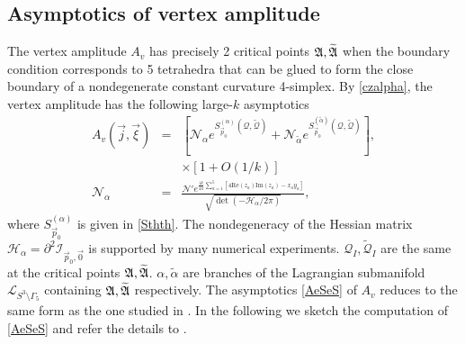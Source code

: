 \documentclass[aps,prd,notitlepage,nofootinbib,superscriptaddress,groupedaddress,twocolumn]{revtex4-1}
\def\be{\begin{eqnarray}}
\def\ee{\end{eqnarray}}
\newcommand{\ci}{\mathcal I}
\newcommand{\cl}{\mathcal L}
\newcommand{\cn}{\mathcal N}
\newcommand{\scrp}{\mathscr{P}}
\newcommand{\scrq}{\mathscr{Q}}
\renewcommand{\a}{\alpha}
\newcommand{\G}{\Gamma}
\newcommand{\rmd}{\mathrm d}
\newcommand{\lt}{\left}
\newcommand{\rt}{\right}
\newcommand{\sn}{\mathscr{N}}
\begin{document}
\subsection{Asymptotics of vertex amplitude}\label{Asymptotics of vertex amplitude}


The vertex amplitude $A_v$ has precisely 2 critical points $\mathfrak{A},\widetilde{\mathfrak{A}}$ when the boundary condition corresponds to 5 tetrahedra that can be glued to form the close boundary of a nondegenerate constant curvature 4-simplex. By \eqref{czalpha}, the vertex amplitude has the following large-$k$ asymptotics
\be
A_v(\vec{j},\vec{\xi})&=&\lt[\sn_\a e^{S_{\vec{p}_{0}}^{(\alpha)}({\scrq}, {\widetilde{\scrq}})}+\sn_{\widetilde \a} e^{S_{\vec{p}_{0}}^{(\widetilde{\alpha})}({\scrq}, {\widetilde{\scrq}})}\rt],\label{AeSeS}\\
&&\times \lt[1+O\lt({1}/{k}\rt)\rt]\nonumber\\
\sn_{\a}&=&\frac{\cn'e^{\frac{ik}{4\pi}\sum_{a=1}^5\lt[4\mathrm{Re}(z_a)\mathrm{Im}(z_a)-x_ay_a\rt]}}{\sqrt{\det (-\mathscr{H}_{\a}/2\pi)}},
\ee
where $S_{\vec{p}_{0}}^{(\alpha)}$ is given in \eqref{Sthth}. The nondegeneracy of the Hessian matrix $\mathscr{H}_{\a}=\partial^2\ci_{\vec{p}_0,\vec{0}}$ is supported by many numerical experiments. ${\scrq}_I, {\widetilde{\scrq}}_I$ are the same at the critical points $\mathfrak{A},\widetilde{\mathfrak{A}}$. $\a,\widetilde{\a}$ are branches of the Lagrangian submanifold $\cl_{S^3\setminus \G_5}$ containing $\mathfrak{A},\widetilde{\mathfrak{A}}$ respectively. The asymptotics \eqref{AeSeS} of $A_v$ reduces to the same form as the one studied in \cite{HHKRshort,3dblockHHKR}. In the following we sketch the computation of \eqref{AeSeS} and refer the details to \cite{HHKRshort,3dblockHHKR}.
\end{document}
